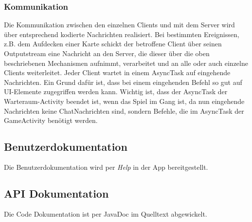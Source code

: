 \documentclass[11pt,a4paper]{article}
\begin{document}
\subsubsection{Kommunikation}
Die Kommunikation zwischen den einzelnen Clients und mit dem Server wird über entsprechend kodierte Nachrichten realisiert. Bei bestimmten Ereignissen, z.B. dem Aufdecken einer Karte schickt der betroffene Client über seinen Outputstream eine Nachricht an den Server, die dieser über die oben beschriebenen Mechanismen aufnimmt, verarbeitet und an alle oder auch einzelne Clients weiterleitet.
Jeder Client wartet in einem AsyncTask auf eingehende Nachrichten. Ein Grund dafür ist, dass bei einem eingehenden Befehl so gut auf UI-Elemente zugegriffen werden kann. Wichtig ist, dass der AsyncTask der Warteraum-Activity beendet ist, wenn das Spiel im Gang ist, da nun eingehende Nachrichten keine ChatNachrichten sind, sondern Befehle, die im AsyncTask der GameActivity benötigt werden. 

\subsection*{Benutzerdokumentation}

Die Benutzerdokumentation wird per {\em Help} in der App bereitgestellt. 

\subsection*{API Dokumentation}

Die Code Dokumentation ist per JavaDoc im Quelltext abgewickelt.
\end{document}
